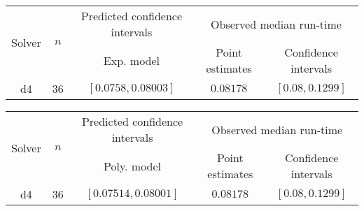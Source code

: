 \begin{tabular}{ccccc}
\hline 
\multirow{2}{*}{Solver} & \multirow{2}{*}{$n$} & Predicted confidence intervals & \multicolumn{2}{c}{Observed median  run-time}\tabularnewline
 &  & Exp. model  & Point estimates  & Confidence intervals\tabularnewline
\hline 
\hline 
\multirow{0}{*}{d4} & 36 & $\mathbf{\left[0.0758,0.08003\right]}$ & $0.08178$ & $\left[0.08,0.1299\right]$ \tabularnewline 
\hline 
\end{tabular} 

\begin{tabular}{ccccc}
\hline 
\multirow{2}{*}{Solver} & \multirow{2}{*}{$n$} & Predicted confidence intervals & \multicolumn{2}{c}{Observed median  run-time}\tabularnewline
 &  & Poly. model  & Point estimates  & Confidence intervals\tabularnewline
\hline 
\hline 
\multirow{0}{*}{d4} & 36 & $\mathbf{\left[0.07514,0.08001\right]}$ & $0.08178$ & $\left[0.08,0.1299\right]$ \tabularnewline 
\hline 
\end{tabular} 


